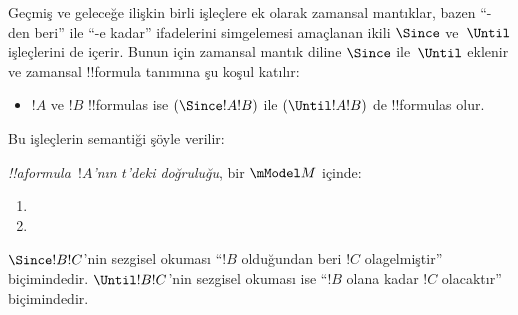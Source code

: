 



Geçmiş ve geleceğe ilişkin birli işleçlere ek olarak zamansal mantıklar,
bazen ``-den beri'' ile ``-e kadar'' ifadelerini simgelemesi amaçlanan ikili
$\Since$ ve~$\Until$ işleçlerini de içerir. Bunun için zamansal mantık
diline $\Since$ ile~$\Until$ eklenir ve zamansal !!{formula} tanımına şu
koşul katılır:

\begin{itemize}
\item[] $!A$ ve $!B$ !!{formula}s ise $(\Since !A !B)$ ile
  $(\Until !A !B)$ de !!{formula}s olur.
\end{itemize}

Bu işleçlerin semantiği şöyle verilir:

\begin{defn}
  \emph{!!a{formula}~$!A$'nın $t$'deki doğruluğu}, bir $\mModel M$ içinde:
  \begin{enumerate}
  \item{} 
  \item{} 
  \end{enumerate} 
\end{defn}

$\Since !B !C$'nin sezgisel okuması ``$!B$ olduğundan beri $!C$
olagelmiştir'' biçimindedir. $\Until !B !C$'nin sezgisel okuması ise
``$!B$ olana kadar $!C$ olacaktır'' biçimindedir.

